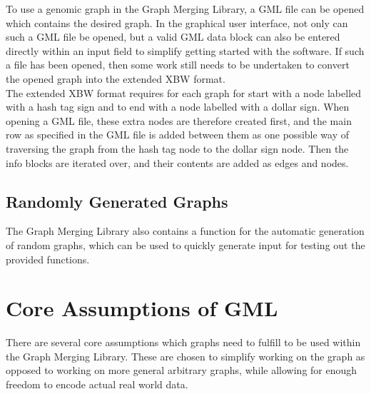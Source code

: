 \documentclass[a4paper,12pt,twoside,BCOR=10mm]{scrbook}
\begin{document}
To use a genomic graph in the Graph Merging Library, 
a GML file can be opened which contains the desired graph. 
In the graphical user interface, not only can such a GML file be opened, 
but a valid GML data block can also be entered directly within an input 
field to simplify getting started with the software. 
If such a file has been opened, then some work still needs to be undertaken 
to convert the opened graph into the extended XBW format. \\
The extended XBW format requires for each graph for start with a node labelled with a 
hash tag sign and to end with a node labelled with a dollar sign. 
When opening a GML file, these extra nodes are therefore created first, and the 
main row as specified in the GML file is added between them as one possible way 
of traversing the graph from the hash tag node to the dollar sign node. 
Then the info blocks are iterated over, and their contents are added as edges and nodes.

\subsection{Randomly Generated Graphs}

The Graph Merging Library also contains a function for the automatic generation 
of random graphs, which can be used to quickly generate input for testing out the 
provided functions.


\section{Core Assumptions of GML}
\label{sec:gml_core_assumptions}
%

There are several core assumptions which graphs need to fulfill to be used within the Graph Merging Library. 
These are chosen to simplify working on the graph as opposed to working on more general arbitrary graphs, 
while allowing for enough freedom to encode actual real world data.
\end{document}
